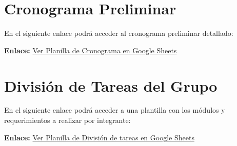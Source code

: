 \documentclass[12pt,a4paper]{article}
\begin{document}
\tableofcontents
\newpage






\section{Cronograma Preliminar}

\begin{tcolorbox}[colframe=green!60!black, colback=green!5!white, arc=2mm, title=\textbf{Cronograma (Google Sheets)}]
  En el siguiente enlace podrá acceder al cronograma preliminar detallado:
  \vspace{0.2cm}
  
  \textbf{Enlace:} \href{https://docs.google.com/spreadsheets/d/1GAEeQZzlFaMgwrWLOeSPeK0nOuYQg2peXEuDazYDfk4/edit?usp=sharing}{Ver Planilla de Cronograma en Google Sheets}
\end{tcolorbox}

\section{División de Tareas del Grupo}

\begin{tcolorbox}[colframe=green!60!black, colback=green!5!white, arc=2mm, title=\textbf{División de tareas (Google Sheets)}]
  En el siguiente enlace podrá acceder a una plantilla con los módulos y requerimientos a realizar por integrante:
  \vspace{0.2cm}
  
  \textbf{Enlace:} \href{https://docs.google.com/spreadsheets/d/1GAEeQZzlFaMgwrWLOeSPeK0nOuYQg2peXEuDazYDfk4/edit?usp=sharing}{Ver Planilla de División de tareas en Google Sheets}
\end{tcolorbox}
\end{document}
